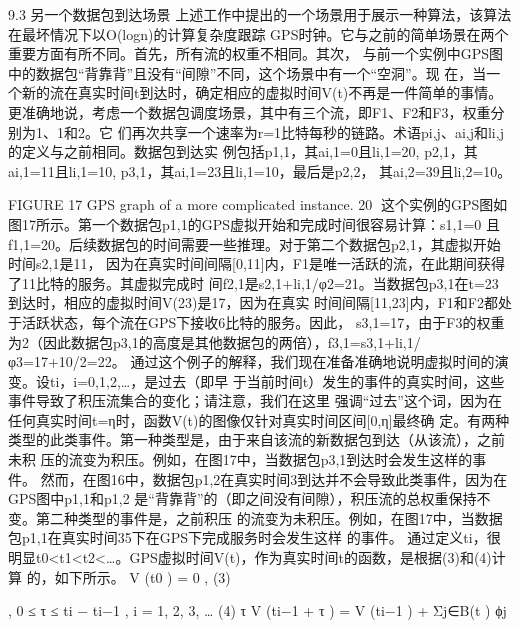 9.3 另一个数据包到达场景
上述工作中提出的一个场景用于展示一种算法，该算法在最坏情况下以O(logn)的计算复杂度跟踪
GPS时钟。它与之前的简单场景在两个重要方面有所不同。首先，所有流的权重不相同。其次，
与前一个实例中GPS图中的数据包“背靠背”且没有“间隙”不同，这个场景中有一个“空洞”。现
在，当一个新的流在真实时间t到达时，确定相应的虚拟时间V(t)不再是一件简单的事情。
更准确地说，考虑一个数据包调度场景，其中有三个流，即F1、F2和F3，权重分别为1、1和2。它
们再次共享一个速率为r=1比特每秒的链路。术语pi,j、ai,j和li,j的定义与之前相同。数据包到达实
例包括p1,1，其ai,1=0且li,1=20, p2,1，其ai,1=11且li,1=10, p3,1，其ai,1=23且li,1=10，最后是p2,2，
其ai,2=39且li,2=10。




                 FIGURE 17 GPS graph of a more complicated instance.
                                                                            20
这个实例的GPS图如图17所示。第一个数据包p1,1的GPS虚拟开始和完成时间很容易计算：s1,1=0
且f1,1=20。后续数据包的时间需要一些推理。对于第二个数据包p2,1，其虚拟开始时间s2,1是11，
因为在真实时间间隔[0,11]内，F1是唯一活跃的流，在此期间获得了11比特的服务。其虚拟完成时
间f2,1是s2,1+li,1/φ2=21。当数据包p3,1在t=23到达时，相应的虚拟时间V(23)是17，因为在真实
时间间隔[11,23]内，F1和F2都处于活跃状态，每个流在GPS下接收6比特的服务。因此，
s3,1=17，由于F3的权重为2（因此数据包p3,1的高度是其他数据包的两倍），f3,1=s3,1+li,1/
φ3=17+10/2=22。
通过这个例子的解释，我们现在准备准确地说明虚拟时间的演变。设ti，i=0,1,2,…，是过去（即早
于当前时间t）发生的事件的真实时间，这些事件导致了积压流集合的变化；请注意，我们在这里
强调“过去”这个词，因为在任何真实时间t=η时，函数V(t)的图像仅针对真实时间区间[0,η]最终确
定。有两种类型的此类事件。第一种类型是，由于来自该流的新数据包到达（从该流），之前未积
压的流变为积压。例如，在图17中，当数据包p3,1到达时会发生这样的事件。
然而，在图16中，数据包p1,2在真实时间3到达并不会导致此类事件，因为在GPS图中p1,1和p1,2
是“背靠背”的（即之间没有间隙），积压流的总权重保持不变。第二种类型的事件是，之前积压
的流变为未积压。例如，在图17中，当数据包p1,1在真实时间35下在GPS下完成服务时会发生这样
的事件。
通过定义ti，很明显t0<t1<t2<…。GPS虚拟时间V(t)，作为真实时间t的函数，是根据(3)和(4)计算
的，如下所示。
 V (t0 ) = 0 , (3)
     ​




                                         , 0 ≤ τ ≤ ti − ti−1 , i = 1, 2, 3, … (4)
                                 τ
 V (ti−1 + τ ) = V (ti−1 ) +
                             Σj∈B(t ) ϕj
         ​           ​                           ​   ​   ​




